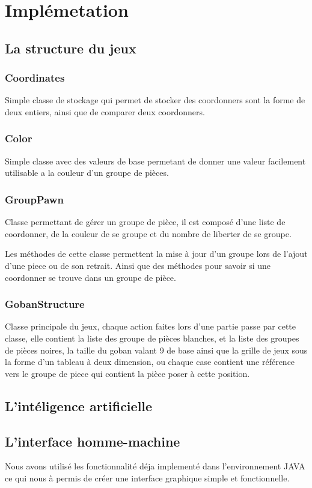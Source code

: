 \chapter{Implémetation}

	\section{La structure du jeux}
	
		\subsection{Coordinates}
			
			Simple classe de stockage qui permet de stocker des coordonners sont la forme de deux entiers,
			ainsi que de comparer deux coordonners.
		
		\subsection{Color}
		
			Simple classe avec des valeurs de base permetant de donner une valeur facilement utilisable a 
			la couleur d'un groupe de pièces.
		
		\subsection{GroupPawn}
		
			Classe permettant de gérer un groupe de pièce, il est composé d'une liste de coordonner, de la couleur de se groupe
			et du nombre de liberter de se groupe.
			
			Les méthodes de cette classe permettent la mise à jour d'un groupe lors de l'ajout d'une piece ou de son retrait. Ainsi
			que des méthodes pour savoir si une coordonner se trouve dans un groupe de pièce.
		
		\subsection{GobanStructure}
		
			Classe principale du jeux, chaque action faites lors d'une partie passe par cette classe, elle contient la liste des groupe 
			de pièces blanches, et la liste des groupes de pièces noires, la taille du goban valant 9 de base ainsi que la grille de jeux
			sous la forme d'un tableau à deux dimension, ou chaque case contient une référence vers le groupe de piece qui contient la pièce
			poser à cette position.

	\section{L'intéligence artificielle}

	
	\section{L'interface homme-machine}
	
		Nous avons utilisé les fonctionnalité déja implementé dans l'environnement JAVA ce qui nous à permis de créer une interface graphique simple et fonctionnelle.
	
\clearpage